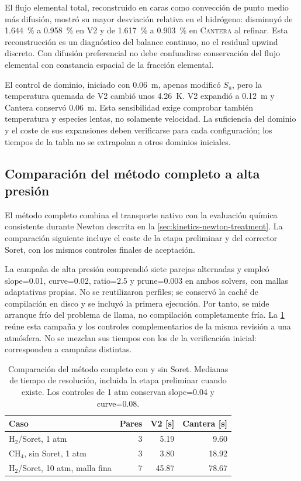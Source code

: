 \documentclass[12pt,a4paper,twoside,openany]{book}
\newcommand{\Su}{S_{\mathrm{u}}}
\newcommand{\Vdos}{\textsc{V2}\xspace}
\newcommand{\Cantera}{\textsc{Cantera}\xspace}
\begin{document}
El flujo elemental total, reconstruido en caras como convección de punto medio
más difusión, mostró su mayor desviación relativa en el hidrógeno: disminuyó
de \SI{1.644}{\percent} a \SI{0.958}{\percent} en \Vdos y de
\SI{1.617}{\percent} a \SI{0.903}{\percent} en \Cantera al refinar. Esta
reconstrucción es un diagnóstico del balance continuo, no el residual upwind
discreto. Con difusión preferencial no debe confundirse conservación del flujo
elemental con constancia espacial de la fracción elemental.

El control de dominio, iniciado con \SI{0.06}{\metre}, apenas modificó
\(\Su\), pero la temperatura quemada de \Vdos cambió unos
\SI{4.26}{\kelvin}. V2 expandió a \SI{0.12}{\metre} y Cantera conservó
\SI{0.06}{\metre}. Esta sensibilidad exige comprobar también temperatura y
especies lentas, no solamente velocidad. La suficiencia del dominio y el coste
de sus expansiones deben verificarse para cada configuración; los tiempos de
la tabla no se extrapolan a otros dominios iniciales.

\subsection{Comparación del método completo a alta presión}

El método completo combina el transporte nativo con la evaluación química
consistente durante Newton descrita en la \cref{sec:kinetics-newton-treatment}.
La comparación siguiente incluye el coste de la etapa preliminar y del
corrector Soret, con los mismos controles finales de aceptación.

La campaña de alta presión comprendió siete parejas alternadas y empleó slope=0.01,
curve=0.02, ratio=2.5 y prune=0.003 en ambos solvers, con mallas adaptativas
propias. No se reutilizaron perfiles; se conservó la caché de compilación en
disco y se incluyó la primera ejecución. Por tanto, se mide arranque frío
del problema de llama, no compilación completamente fría.
La \cref{tab:soret-signed-kinetics-timing} reúne esta campaña y los controles
complementarios de la misma revisión a una atmósfera. No se mezclan sus tiempos
con los de la verificación inicial: corresponden a campañas distintas.

\begin{table}[htbp]
\centering
\caption{Comparación del método completo con y sin Soret.
Medianas de tiempo de resolución, incluida la etapa preliminar cuando existe.
Los controles de 1 atm conservan slope=0.04 y curve=0.08.}
\label{tab:soret-signed-kinetics-timing}
\begin{tabular}{@{}lrrr@{}}
\toprule
\textbf{Caso} & \textbf{Pares} & \textbf{V2 [s]} & \textbf{Cantera [s]}\\
\midrule
H\(_2\)/Soret, 1 atm & 3 & 5.19 & 9.60\\
CH\(_4\), sin Soret, 1 atm & 3 & 3.80 & 18.92\\
H\(_2\)/Soret, 10 atm, malla fina & 7 & 45.87 & 78.67\\
\bottomrule
\end{tabular}
\end{table}
\end{document}
